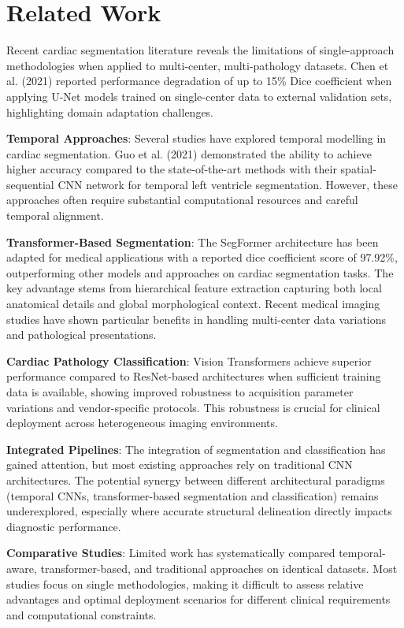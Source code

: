 \documentclass[twoside,11pt]{article}
\begin{document}
  \section{Related Work}

  Recent cardiac segmentation literature reveals the limitations of single-approach methodologies when applied to multi-center, multi-pathology datasets. Chen et al. (2021) reported performance degradation of up to 15\% Dice coefficient when applying U-Net models trained on single-center data to external validation sets, highlighting domain adaptation challenges.
  
  \textbf{Temporal Approaches}: Several studies have explored temporal modelling in cardiac segmentation. Guo et al. (2021) demonstrated the ability to achieve higher accuracy compared to the state-of-the-art methods with their spatial-sequential CNN network for temporal left ventricle segmentation\cite{guo2021}. However, these approaches often require substantial computational resources and careful temporal alignment.
  
  \textbf{Transformer-Based Segmentation}: The SegFormer architecture has been adapted for medical applications with a reported dice coefficient score of 97.92\%, outperforming other models and approaches on cardiac segmentation tasks\cite{wu2024}. The key advantage stems from hierarchical feature extraction capturing both local anatomical details and global morphological context. Recent medical imaging studies have shown particular benefits in handling multi-center data variations and pathological presentations.
  
  \textbf{Cardiac Pathology Classification}: Vision Transformers achieve superior performance compared to ResNet-based architectures when sufficient training data is available, showing improved robustness to acquisition parameter variations and vendor-specific protocols. This robustness is crucial for clinical deployment across heterogeneous imaging environments.
  
  \textbf{Integrated Pipelines}: The integration of segmentation and classification has gained attention, but most existing approaches rely on traditional CNN architectures. The potential synergy between different architectural paradigms (temporal CNNs, transformer-based segmentation and classification) remains underexplored, especially where accurate structural delineation directly impacts diagnostic performance.
  
  \textbf{Comparative Studies}: Limited work has systematically compared temporal-aware, transformer-based, and traditional approaches on identical datasets. Most studies focus on single methodologies, making it difficult to assess relative advantages and optimal deployment scenarios for different clinical requirements and computational constraints.
\end{document}
